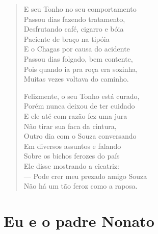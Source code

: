 \begin{verse}
E seu Tonho no seu comportamento\\
Passou dias fazendo tratamento,\\
Desfrutando café, cigarro e bóia\\
Paciente de braço na tipóia\\
E o Chagas por causa do acidente\\
Passou dias folgado, bem contente,\\
Pois quando ia pra roça era sozinha,\\
Muitas vezes voltava do caminho.

Felizmente, o seu Tonho está curado,\\
Porém nunca deixou de ter cuidado\\
E ele até com razão fez uma jura\\
Não tirar sua faca da cintura,\\
Outro dia com o Souza conversando\\
Em diversos assuntos e falando\\
Sobre os bichos ferozes do país\\
Ele disse mostrando a cicatriz:\\
--- Pode crer meu prezado amigo Souza\\
Não há um tão feroz como a raposa.
\end{verse}

\chapter{Eu e o padre Nonato}


